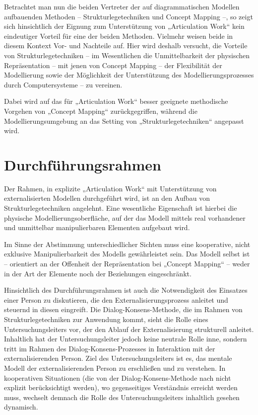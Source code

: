 Betrachtet man nun die beiden Vertreter der auf diagrammatischen Modellen aufbauenden Methoden -- Strukturlegetechniken und Concept Mapping --, so zeigt sich hinsichtlich der Eignung zum Unterstützung von „Articulation Work“ kein eindeutiger Vorteil für eine der beiden Methoden. Vielmehr weisen beide in diesem Kontext Vor- und Nachteile auf. Hier wird deshalb versucht, die Vorteile von Strukturlegetechniken -- im Wesentlichen die Unmittelbarkeit der physischen Repräsentation -- mit jenen von Concept Mapping -- der Flexibilität der Modellierung sowie der Möglichkeit der Unterstützung des Modellierungsprozesses durch Computersysteme -- zu vereinen.

Dabei wird auf das für „Articulation Work“ besser geeignete methodische Vorgehen von „Concept Mapping“ zurückgegriffen, während die Modellierungsumgebung an das Setting von „Strukturlegetechniken“ angepasst wird.

\section{Durchführungsrahmen} %
\label{sec:durchführungsrahmen}

Der Rahmen, in explizite „Articulation Work“ mit Unterstützung von externalisierten Modellen durchgeführt wird, ist an den Aufbau von Strukturlegetechniken angelehnt. Eine wesentliche Eigenschaft ist hierbei die physische Modellierungsoberfläche, auf der das Modell mittels real vorhandener und unmittelbar manipulierbaren Elementen aufgebaut wird. 

Im Sinne der Abstimmung unterschiedlicher Sichten muss eine kooperative, nicht exklusive Manipulierbarkeit des Modells gewährleistet sein. Das Modell selbst ist -- orientiert an der Offenheit der Repräsentation bei „Concept Mapping“ -- weder in der Art der Elemente noch der Beziehungen eingeschränkt. 

Hinsichtlich des Durchführungsrahmen ist auch die Notwendigkeit des Einsatzes einer Person zu diskutieren, die den Externalisierungsprozess anleitet und steuernd in diesen eingreift. Die Dialog-Konsens-Methode, die im Rahmen von Strukturlegetechniken zur Anwendung kommt, sieht die Rolle eines Untersuchungsleiters vor, der den Ablauf der Externalisierung strukturell anleitet. Inhaltlich hat der Untersuchungsleiter jedoch keine neutrale Rolle inne, sondern tritt im Rahmen des Dialog-Konsens-Prozesses in Interaktion mit der externalisierenden Person. Ziel des Untersuchungsleiters ist es, das mentale Modell der externalisierenden Person zu erschließen und zu verstehen. In kooperativen Situationen (die von der Dialog-Konsens-Methode nach \citep{Scheele88} nicht explizit berücksichtigt werden), wo gegenseitiges Verständnis erreicht werden muss, wechselt demnach die Rolle des Untersuchungsleiters inhaltlich gesehen dynamisch. 


